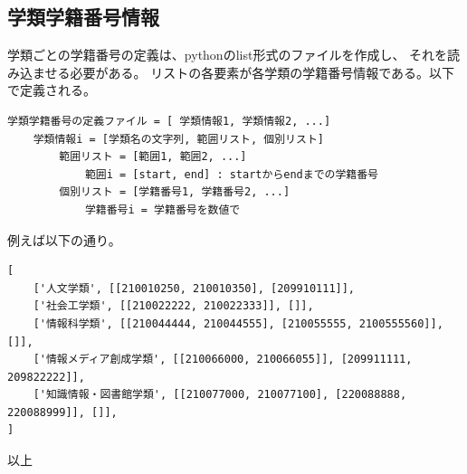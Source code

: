 \subsection{学類学籍番号情報}
\label{gakurui-info}

学類ごとの学籍番号の定義は、pythonのlist形式のファイルを作成し、
それを読み込ませる必要がある。
リストの各要素が各学類の学籍番号情報である。以下で定義される。
\begin{tcolorbox}[enhanced jigsaw,breakable,colframe=\mycolor ,colback=white,colbacktitle=\mycolor ,coltitle=white,fonttitle=\bfseries\sffamily]

\begin{verbatim}
学類学籍番号の定義ファイル = [ 学類情報1, 学類情報2, ...]
    学類情報i = [学類名の文字列, 範囲リスト, 個別リスト]
        範囲リスト = [範囲1, 範囲2, ...]
            範囲i = [start, end] : startからendまでの学籍番号
        個別リスト = [学籍番号1, 学籍番号2, ...]
            学籍番号i = 学籍番号を数値で
\end{verbatim}

\end{tcolorbox}
例えば以下の通り。
\begin{tcolorbox}[enhanced jigsaw,breakable,colframe=\mycolor ,colback=white,colbacktitle=\mycolor ,coltitle=white,fonttitle=\bfseries\sffamily,title=学類学籍番号情報定義]

\begin{verbatim}
[
    ['人文学類', [[210010250, 210010350], [209910111]],
    ['社会工学類', [[210022222, 210022333]], []],
    ['情報科学類', [[210044444, 210044555], [210055555, 2100555560]], []],
    ['情報メディア創成学類', [[210066000, 210066055]], [209911111, 209822222]],
    ['知識情報・図書館学類', [[210077000, 210077100], [220088888, 220088999]], []],
] 
\end{verbatim}

\end{tcolorbox}

\hfill  以上


